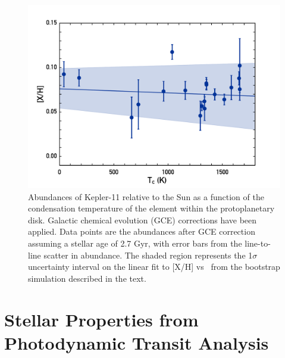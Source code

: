 \documentclass[oneside]{emulateapj}
\begin{document}

\begin{figure}
\centering
\includegraphics[scale=0.45]{K11_Tc_linear}
\caption{Abundances of Kepler-11 relative to the Sun as a function of the condensation temperature of the element within the protoplanetary disk. Galactic chemical evolution (GCE) corrections have been applied. Data points are the abundances after GCE correction assuming a stellar age of 2.7 Gyr, with error bars from the line-to-line scatter in abundance. The shaded region represents the 1$\sigma$ uncertainty interval on the linear fit to [X/H] vs \tc\ from the bootstrap simulation described in the text.}
\label{fig:tc}
\end{figure}




\section{Stellar Properties from Photodynamic Transit Analysis}
\label{s:ttvs}
\end{document}
